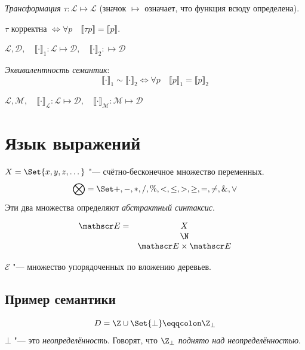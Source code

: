 \begin{definition}
	\emph{Трансформация} $ \tau : \mathscr L \mapsto \mathscr L $ (значок $ \mapsto $ означает, что
	функция всюду определена).

	$ \tau $ корректна $ \iff \forall p \quad \llbracket\tau p\rrbracket = \llbracket p\rrbracket $.
\end{definition}

\begin{definition}
	$ \mathscr L, \mathscr D, \quad \llbracket\cdot\rrbracket_1 : \mathscr L \mapsto \mathscr D, \quad
	\llbracket\cdot\rrbracket_2 : \mathscr \mapsto \mathscr D $

	\emph{Эквивалентность семантик}:
	$$ \llbracket\cdot\rrbracket_1 \sim \llbracket\cdot\rrbracket_2 \iff
	\forall p \quad \llbracket p\rrbracket_1 = \llbracket p\rrbracket_2 $$
\end{definition}

\begin{definition}
	$ \mathscr L, \mathscr M, \quad \llbracket\cdot\rrbracket_{\mathscr L} : \mathscr L \mapsto \mathscr D, \quad
	\llbracket\cdot\rrbracket_{\mathscr M} : \mathscr M \mapsto \mathscr D $

\end{definition}

\section{Язык выражений}

$ X = \Set{x, y, z, \dotsc} $ "--- счётно-бесконечное множество переменных.
$$ \bigotimes = \Set{+, -, *, /, \%, <, \le, >, \ge, =, \ne, \&, \vee} $$
Эти два множества определяют \emph{абстрактный синтаксис}.

$$
\begin{matrix}
	\mathscr E = & X \\
				 & \N \\
				 & \mathscr E \times \mathscr E
\end{matrix} $$

$ \mathscr E $ "--- множество упорядоченных по вложению деревьев.

\subsection*{Пример семантики}

$$ D = \Z \cup \Set{\bot} \eqqcolon \Z_\bot $$
$ \bot $ "--- это \emph{неопределённость}.
Говорят, что $ \Z_\bot $ \emph{поднято над неопределённостью}.

